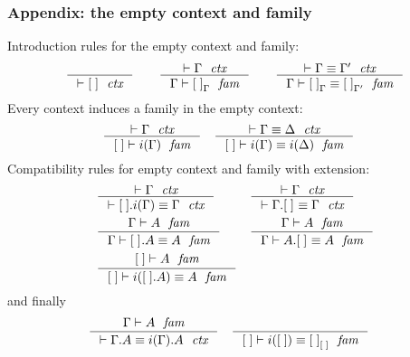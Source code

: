 \documentclass[handout]{beamer}
\begin{document}
\begin{frame}
\frametitle{\bf Appendix: the empty context and family}
\begin{small}
Introduction rules for the empty context and family:
\begin{equation*}
\inference
  { }
  { \jctx{\emptyc}
    }
\qquad
\inference
  { \jctx{\Gamma}
    }
  { \jfam{\Gamma}{\emptyf[\Gamma]}
    }
\qquad
\inference
  { \jctxeq{\Gamma}{\Gamma'}
    }
  { \jfameq{\Gamma}{\emptyf[\Gamma]}{\emptyf[\Gamma']}
    }
\end{equation*}
\pause
Every context induces a family in the empty context:
\begin{align*}
& \inference
  { \jctx{\Gamma}
    }
  { \jfam{\emptyc}{i(\Gamma)}
    } 
  &
& \inference
  { \jctxeq{\Gamma}{\Delta}
    }
  { \jfameq{\emptyc}{i(\Gamma)}{i(\Delta)}
    }
\end{align*}
\pause
Compatibility rules for empty context and family with extension:
\begin{align*}
& \inference
  { \jctx{\Gamma}
    }
  { \jctxeq{\ctxext{\emptyc}{i(\Gamma)}}{\Gamma}
    }
& 
& \inference
  { \jctx{\Gamma}
    }
  { \jctxeq{\ctxext{\Gamma}{\emptyf}}{\Gamma}
    }
  \\
& \inference
  { \jfam{\Gamma}{A}
    }
  { \jfameq{\Gamma}{\ctxext{\emptyf}{A}}{A}
    }
&
& \inference
  { \jfam{\Gamma}{A}
    }
  { \jfameq{\Gamma}{{A}{\emptyf}}{A}
    }
  \\
& \inference
  { \jfam{\emptyc}{A}
    }
  { \jfameq{\emptyc}{i(\ctxext{\emptyc}{A})}{A}
    }
\end{align*}
\pause
and finally
\begin{align*}
& \inference
  { \jfam{\Gamma}{A}
    }
  { \jctxeq{\ctxext{\Gamma}{A}}{\ctxext{i(\Gamma)}{A}}
    }
& &
\inference
  { }
  { \jfameq{\emptyc}{i(\emptyc)}{\emptyf[\emptyc]}}
\end{align*}
\end{small}
\end{frame}
\end{document}
